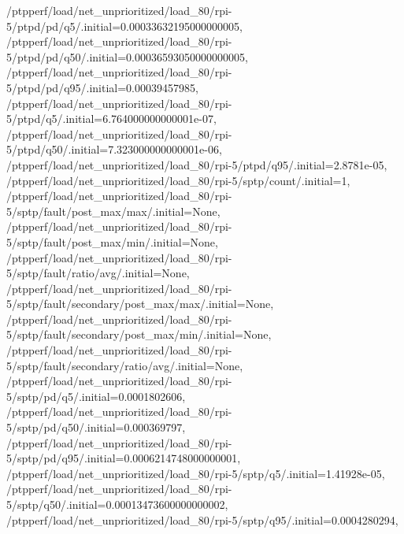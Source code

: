 {    /ptpperf/load/net_unprioritized/load_80/rpi-5/ptpd/pd/q5/.initial=0.00033632195000000005,
    /ptpperf/load/net_unprioritized/load_80/rpi-5/ptpd/pd/q50/.initial=0.00036593050000000005,
    /ptpperf/load/net_unprioritized/load_80/rpi-5/ptpd/pd/q95/.initial=0.00039457985,
    /ptpperf/load/net_unprioritized/load_80/rpi-5/ptpd/q5/.initial=6.764000000000001e-07,
    /ptpperf/load/net_unprioritized/load_80/rpi-5/ptpd/q50/.initial=7.323000000000001e-06,
    /ptpperf/load/net_unprioritized/load_80/rpi-5/ptpd/q95/.initial=2.8781e-05,
    /ptpperf/load/net_unprioritized/load_80/rpi-5/sptp/count/.initial=1,
    /ptpperf/load/net_unprioritized/load_80/rpi-5/sptp/fault/post_max/max/.initial=None,
    /ptpperf/load/net_unprioritized/load_80/rpi-5/sptp/fault/post_max/min/.initial=None,
    /ptpperf/load/net_unprioritized/load_80/rpi-5/sptp/fault/ratio/avg/.initial=None,
    /ptpperf/load/net_unprioritized/load_80/rpi-5/sptp/fault/secondary/post_max/max/.initial=None,
    /ptpperf/load/net_unprioritized/load_80/rpi-5/sptp/fault/secondary/post_max/min/.initial=None,
    /ptpperf/load/net_unprioritized/load_80/rpi-5/sptp/fault/secondary/ratio/avg/.initial=None,
    /ptpperf/load/net_unprioritized/load_80/rpi-5/sptp/pd/q5/.initial=0.0001802606,
    /ptpperf/load/net_unprioritized/load_80/rpi-5/sptp/pd/q50/.initial=0.000369797,
    /ptpperf/load/net_unprioritized/load_80/rpi-5/sptp/pd/q95/.initial=0.0006214748000000001,
    /ptpperf/load/net_unprioritized/load_80/rpi-5/sptp/q5/.initial=1.41928e-05,
    /ptpperf/load/net_unprioritized/load_80/rpi-5/sptp/q50/.initial=0.00013473600000000002,
    /ptpperf/load/net_unprioritized/load_80/rpi-5/sptp/q95/.initial=0.0004280294,}